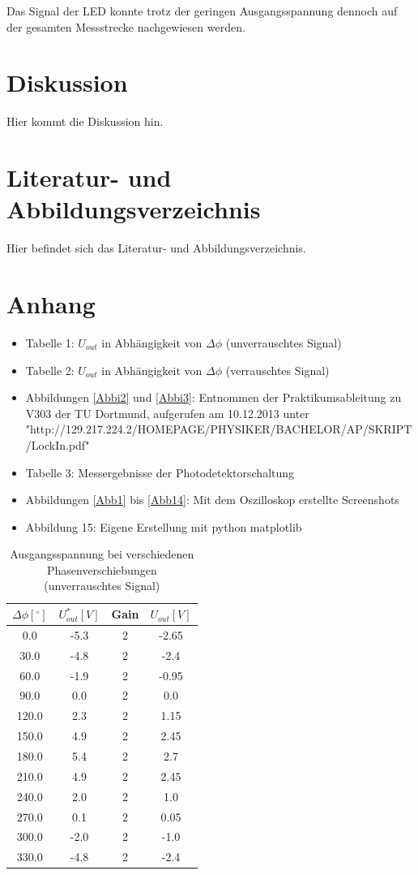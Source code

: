 \documentclass[11pt]{article}
\begin{document}
\noindent
Das Signal der LED konnte trotz der geringen Ausgangsspannung dennoch auf der gesamten Messstrecke nachgewiesen werden. 


\section{Diskussion}
Hier kommt die Diskussion hin.
\section{Literatur- und Abbildungsverzeichnis}
Hier befindet sich das Literatur- und Abbildungsverzeichnis.


\section{Anhang}
\begin{itemize}
\item Tabelle 1: $U_{out}$ in Abhängigkeit von $\Delta\phi$ (unverrauschtes Signal)
\item Tabelle 2: $U_{out}$ in Abhängigkeit von $\Delta\phi$ (verrauschtes Signal)
\item Abbildungen \ref{Abbi2} und \ref{Abbi3}: Entnommen der Praktikumsableitung zu V303 der TU Dortmund, aufgerufen am 10.12.2013 unter \newline "http://129.217.224.2/HOMEPAGE/PHYSIKER/BACHELOR/AP/SKRIPT/LockIn.pdf"
\item Tabelle 3: Messergebnisse der Photodetektorschaltung
\item Abbildungen \ref{Abb1} bis \ref{Abb14}: Mit dem Oszilloskop erstellte Screenshots
\item Abbildung 15: Eigene Erstellung mit python matplotlib
 
\end{itemize}
\newpage

\begin{table}[h!]
\centering
\begin{tabular}{|c|c|c|c|}
\hline
$\Delta \phi [^\circ]$ & $U_{out}^* [V]$ & Gain & $U_{out} [V]$ \\
\hline
0.0 & -5.3 & 2 & -2.65\\
30.0 & -4.8 & 2 &-2.4\\
60.0 & -1.9 & 2 &-0.95\\
90.0 & 0.0 & 2 &0.0\\
120.0 & 2.3 & 2 &1.15\\
150.0 & 4.9 & 2 &2.45\\
180.0 & 5.4 & 2 &2.7\\
210.0 & 4.9 & 2 &2.45\\
240.0 & 2.0 & 2 &1.0\\
270.0 & 0.1 & 2 &0.05\\
300.0 & -2.0 & 2 &-1.0\\
330.0 & -4.8 & 2 &-2.4\\
\hline
\end{tabular}
\label{data1}
\caption{Ausgangsspannung bei verschiedenen Phasenverschiebungen \newline (unverrauschtes Signal)}
\end{table}
\end{document}
